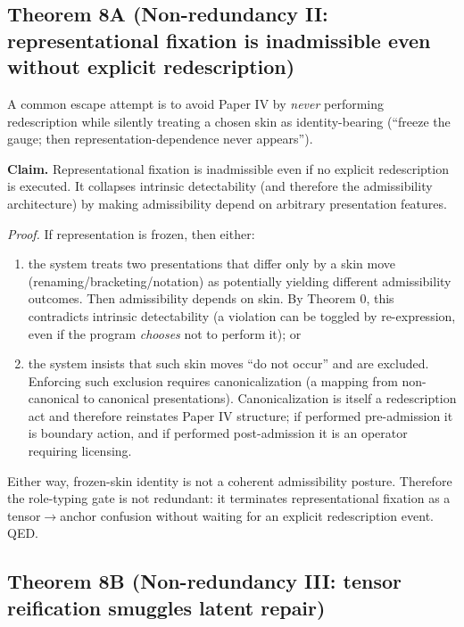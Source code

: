 \documentclass[12pt]{article}
\theoremstyle{plain}
\begin{document}
\subsection{Theorem 8A (Non-redundancy II: representational fixation is inadmissible even without explicit redescription)}

A common escape attempt is to avoid Paper IV by \emph{never} performing redescription while silently treating a chosen skin as identity-bearing (``freeze the gauge; then representation-dependence never appears'').

\medskip

\noindent\textbf{Claim.} Representational fixation is inadmissible even if no explicit redescription is executed. It collapses intrinsic detectability (and therefore the admissibility architecture) by making admissibility depend on arbitrary presentation features.

\textit{Proof.} If representation is frozen, then either:

\begin{enumerate}[leftmargin=*]
\item the system treats two presentations that differ only by a skin move (renaming/bracketing/notation) as potentially yielding different admissibility outcomes. Then admissibility depends on skin. By Theorem 0, this contradicts intrinsic detectability (a violation can be toggled by re-expression, even if the program \emph{chooses} not to perform it); or
\item the system insists that such skin moves ``do not occur'' and are excluded. Enforcing such exclusion requires canonicalization (a mapping from non-canonical to canonical presentations). Canonicalization is itself a redescription act and therefore reinstates Paper IV structure; if performed pre-admission it is boundary action, and if performed post-admission it is an operator requiring licensing.
\end{enumerate}

Either way, frozen-skin identity is not a coherent admissibility posture. Therefore the role-typing gate is not redundant: it terminates representational fixation as a tensor$\rightarrow$anchor confusion without waiting for an explicit redescription event. QED.

\subsection{Theorem 8B (Non-redundancy III: tensor reification smuggles latent repair)}
\end{document}
